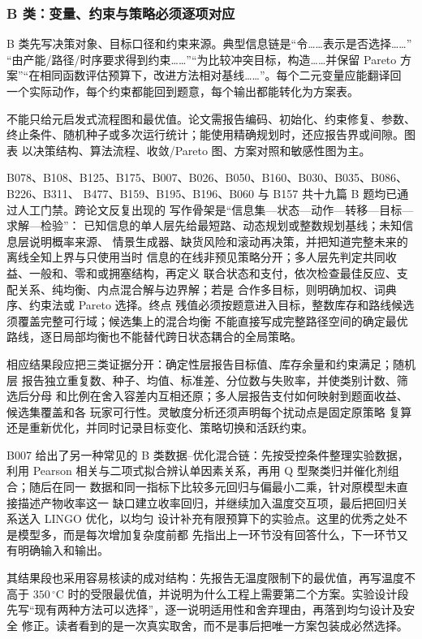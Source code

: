 \subsubsection{B 类：变量、约束与策略必须逐项对应}

B 类先写决策对象、目标口径和约束来源。典型信息链是“令……表示是否选择……”
“由产能/路径/时序要求得到约束……”“为比较冲突目标，构造……并保留 Pareto
方案”“在相同函数评估预算下，改进方法相对基线……”。每个二元变量应能翻译回
一个实际动作，每个约束都能回到题意，每个输出都能转化为方案表。

不能只给元启发式流程图和最优值。论文需报告编码、初始化、约束修复、参数、
终止条件、随机种子或多次运行统计；能使用精确规划时，还应报告界或间隙。图表
以决策结构、算法流程、收敛/Pareto 图、方案对照和敏感性图为主。

B078、B108、B125、B175、B007、B026、B050、B160、B030、B035、B086、B226、B311、
B477、B159、B195、B196、B060 与 B157 共十九篇 B 题均已通过人工门禁。跨论文反复出现的
写作骨架是“信息集—状态—动作—转移—目标—求解—检验”：
已知信息的单人层先给最短路、动态规划或整数规划基线；未知信息层说明概率来源、
情景生成器、缺货风险和滚动再决策，并把知道完整未来的离线全知上界与只使用当时
信息的在线非预见策略分开；多人层先判定共同收益、一般和、零和或拥塞结构，再定义
联合状态和支付，依次检查最佳反应、支配关系、纯均衡、内点混合解与边界解；若是
合作多目标，则明确加权、词典序、约束法或 Pareto 选择。终点
残值必须按题意进入目标，整数库存和路线候选须覆盖完整可行域；候选集上的混合均衡
不能直接写成完整路径空间的确定最优路线，逐日局部均衡也不能替代跨日状态耦合的全局策略。

相应结果段应把三类证据分开：确定性层报告目标值、库存余量和约束满足；随机层
报告独立重复数、种子、均值、标准差、分位数与失败率，并使类别计数、筛选后分母
和比例在舍入容差内互相还原；多人层报告支付如何映射到题面收益、候选集覆盖和各
玩家可行性。灵敏度分析还须声明每个扰动点是固定原策略
复算还是重新优化，并同时记录目标变化、策略切换和活跃约束。

B007 给出了另一种常见的 B 类数据--优化混合链：先按受控条件整理实验数据，利用
Pearson 相关与二项式拟合辨认单因素关系，再用 Q 型聚类归并催化剂组合；随后在同一
数据和同一指标下比较多元回归与偏最小二乘，针对原模型未直接描述产物收率这一
缺口建立收率回归，并继续加入温度交互项，最后把回归关系送入 LINGO 优化，以均匀
设计补充有限预算下的实验点。这里的优秀之处不是模型多，而是每次增加复杂度前都
先指出上一环节没有回答什么，下一环节又有明确输入和输出。

其结果段也采用容易核读的成对结构：先报告无温度限制下的最优值，再写温度不高于
$350\,^{\circ}\mathrm{C}$ 时的受限最优值，并说明为什么工程上需要第二个方案。实验设计段
先写“现有两种方法可以选择”，逐一说明适用性和舍弃理由，再落到均匀设计及安全
修正。读者看到的是一次真实取舍，而不是事后把唯一方案包装成必然选择。

